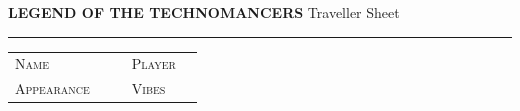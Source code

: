 \documentclass[10pt,oneside]{memoir}
\begin{document}
\color{atrInk}
\pagestyle{empty}

\noindent
{\hdfont\bfseries\normalsize\color{atrAccent}LEGEND OF THE TECHNOMANCERS}
\hfill
{\hdfont\small\color{atrRule}Traveller Sheet}
\par\vspace{2pt}
{\color{atrAccent}\rule{\linewidth}{1.2pt}}
\par\vspace{5pt}

\begin{tabularx}{\linewidth}{@{}lXp{4mm}lX@{}}
  {\small\textsc{Name}} &
  \underline{\hfill} & &
  {\small\textsc{Player}} &
  \underline{\hfill} \\[6pt]
  {\small\textsc{Appearance}} &
  \underline{\hfill} & &
  {\small\textsc{Vibes}} &
  \underline{\hfill} \\
\end{tabularx}

\par\vspace{6pt}
\end{document}
